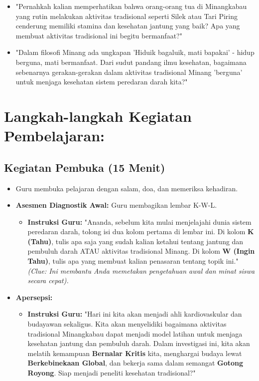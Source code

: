 \documentclass[a4paper,12pt]{article}
\begin{document}
\begin{itemize}
\item "Pernahkah kalian memperhatikan bahwa orang-orang tua di Minangkabau yang rutin melakukan aktivitas tradisional seperti Silek atau Tari Piring cenderung memiliki stamina dan kesehatan jantung yang baik? Apa yang membuat aktivitas tradisional ini begitu bermanfaat?"
\item "Dalam filosofi Minang ada ungkapan 'Hiduik bagaluik, mati bapakai' - hidup berguna, mati bermanfaat. Dari sudut pandang ilmu kesehatan, bagaimana sebenarnya gerakan-gerakan dalam aktivitas tradisional Minang 'berguna' untuk menjaga kesehatan sistem peredaran darah kita?"
\end{itemize}

\section{Langkah-langkah Kegiatan Pembelajaran:}

\subsection{Kegiatan Pembuka (15 Menit)}
\begin{itemize}
\item Guru membuka pelajaran dengan salam, doa, dan memeriksa kehadiran.
\item \textbf{Asesmen Diagnostik Awal:} Guru membagikan lembar K-W-L.
    \begin{itemize}
    \item \textbf{Instruksi Guru:} "Ananda, sebelum kita mulai menjelajahi dunia sistem peredaran darah, tolong isi dua kolom pertama di lembar ini. Di kolom \textbf{K (Tahu)}, tulis apa saja yang sudah kalian ketahui tentang jantung dan pembuluh darah ATAU aktivitas tradisional Minang. Di kolom \textbf{W (Ingin Tahu)}, tulis apa yang membuat kalian penasaran tentang topik ini." \textit{(Clue: Ini membantu Anda memetakan pengetahuan awal dan minat siswa secara cepat).}
    \end{itemize}
\item \textbf{Apersepsi:}
    \begin{itemize}
    \item \textbf{Instruksi Guru:} "Hari ini kita akan menjadi ahli kardiovaskular dan budayawan sekaligus. Kita akan menyelidiki bagaimana aktivitas tradisional Minangkabau dapat menjadi model latihan untuk menjaga kesehatan jantung dan pembuluh darah. Dalam investigasi ini, kita akan melatih kemampuan \textbf{Bernalar Kritis} kita, menghargai budaya lewat \textbf{Berkebinekaan Global}, dan bekerja sama dalam semangat \textbf{Gotong Royong}. Siap menjadi peneliti kesehatan tradisional?"
    \end{itemize}
\end{itemize}
\end{document}
